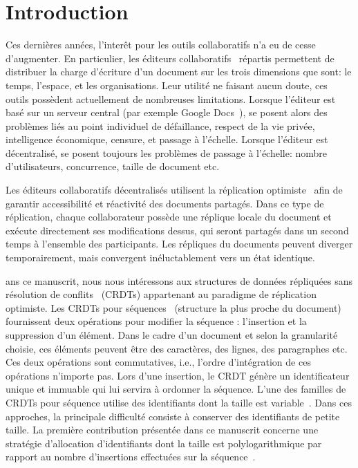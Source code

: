 
\section{Introduction}

Ces dernières années, l'interêt pour les outils collaboratifs n'a eu de cesse
d'augmenter. En particulier, les éditeurs
collaboratifs~\cite{ellis1991groupware} répartis permettent de distribuer la
charge d'écriture d'un document sur les trois dimensions que sont: le temps,
l'espace, et les organisations. Leur utilité ne faisant aucun doute, ces outils
possèdent actuellement de nombreuses limitations. Lorsque l'éditeur est basé sur
un serveur central (par exemple Google Docs~\cite{nichols1995high}), se posent
alors des problèmes liés au point individuel de défaillance, respect de la vie
privée, intelligence économique, censure, et passage à l'échelle. Lorsque
l'éditeur est décentralisé, se posent toujours les problèmes de passage à
l'échelle: nombre d'utilisateurs, concurrence, taille de document etc.

Les éditeurs collaboratifs décentralisés utilisent la réplication
optimiste~\cite{saito2005optimistic} afin de garantir accessibilité et
réactivité des documents partagés. Dans ce type de réplication, chaque
collaborateur possède une réplique locale du document et exécute directement ses
modifications dessus, qui seront partagés dans un second temps à l'ensemble des
participants. Les répliques du documents peuvent diverger temporairement, mais
convergent inéluctablement vers un état identique.

ans ce manuscrit, nous nous intéressons aux structures de données répliquées
sans résolution de conflits~\cite{shapiro2011comprehensive, shapiro2011conflict}
(CRDTs) appartenant au paradigme de réplication optimiste. Les CRDTs pour
séquences~\cite{ahmed2011evaluating, conway2014language, grishchenko2010deep,
  oster2006data, preguica2009commutative, roh2011replicated, weiss2007wooki,
  wu2010partial, Yu2012stringwise, andre2013supporting, weiss2009logoot}
(structure la plus proche du document) fournissent deux opérations pour modifier
la séquence : l'insertion et la suppression d'un élément. Dans le cadre d'un
document et selon la granularité choisie, ces éléments peuvent être des
caractères, des lignes, des paragraphes etc. Ces deux opérations sont
commutatives, i.e., l'ordre d'intégration de ces opérations n'importe pas. Lors
d'une insertion, le CRDT génère un identificateur unique et immuable qui lui
servira à ordonner la séquence. L'une des familles de CRDTs pour séquence
utilise des identifiants dont la taille est
variable~\cite{preguica2009commutative,
  andre2013supporting,weiss2009logoot}. Dans ces approches, la principale
difficulté consiste à conserver des identifiants de petite taille. La première
contribution présentée dans ce manuscrit concerne une stratégie d'allocation
d'identifiants dont la taille est polylogarithmique par rapport au nombre
d'insertions effectuées sur la séquence~\cite{nedelec2013lseq,
  nedelec2013concurrency}.

